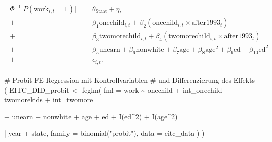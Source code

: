 \documentclass[
  a4paper,
  DIV=11,
  oneside]{scrreprt}
\newenvironment{Shaded}{\begin{snugshade}}{\end{snugshade}}
\newcommand{\AttributeTok}[1]{\textcolor[rgb]{0.40,0.45,0.13}{#1}}
\newcommand{\CommentTok}[1]{\textcolor[rgb]{0.37,0.37,0.37}{#1}}
\newcommand{\DecValTok}[1]{\textcolor[rgb]{0.68,0.00,0.00}{#1}}
\newcommand{\FunctionTok}[1]{\textcolor[rgb]{0.28,0.35,0.67}{#1}}
\newcommand{\NormalTok}[1]{\textcolor[rgb]{0.00,0.23,0.31}{#1}}
\newcommand{\OtherTok}[1]{\textcolor[rgb]{0.00,0.23,0.31}{#1}}
\newcommand{\SpecialCharTok}[1]{\textcolor[rgb]{0.37,0.37,0.37}{#1}}
\newcommand{\StringTok}[1]{\textcolor[rgb]{0.13,0.47,0.30}{#1}}
\begin{document}
\begin{align}
  \begin{split}
    \Phi^{-1}\bigg[P(\text{work}_{i,t} = 1)\bigg] =&\, \theta_\text{Staat} + \eta_t \\
    +&\, \beta_1 \text{onechild}_{i,t} + \beta_2 (\text{onechild}_{i,t} \times \text{after1993}_t) \\
    +&\, \beta_3 \text{twomorechild}_{i,t} + \beta_4 (\text{twomorechild}_{i,t} \times \text{after1993}_t) \\
    +&\, \beta_5 \text{unearn} + \beta_6 \text{nonwhite} + \beta_7 \text{age} + \beta_8 \text{age}^2 + \beta_9 \text{ed} + \beta_{10} \text{ed}^2 \\
    +&\, \epsilon_{i,t}.
  \end{split}
\end{align}

\begin{Shaded}
\begin{Highlighting}[]
\CommentTok{\# Probit{-}FE{-}Regression mit Kontrollvariablen}
\CommentTok{\# und Differenzierung des Effekts}
\NormalTok{(}
\NormalTok{  EITC\_DID\_probit }\OtherTok{\textless{}{-}} \FunctionTok{feglm}\NormalTok{(}
    \AttributeTok{fml =}\NormalTok{ work }\SpecialCharTok{\textasciitilde{}}\NormalTok{ onechild }\SpecialCharTok{+}\NormalTok{ int\_onechild}
    \SpecialCharTok{+}\NormalTok{ twomorekids }\SpecialCharTok{+}\NormalTok{ int\_twomore}
    
    \SpecialCharTok{+}\NormalTok{ unearn }\SpecialCharTok{+}\NormalTok{ nonwhite }\SpecialCharTok{+}\NormalTok{ age }\SpecialCharTok{+}\NormalTok{ ed }
    \SpecialCharTok{+} \FunctionTok{I}\NormalTok{(ed}\SpecialCharTok{\^{}}\DecValTok{2}\NormalTok{) }\SpecialCharTok{+} \FunctionTok{I}\NormalTok{(age}\SpecialCharTok{\^{}}\DecValTok{2}\NormalTok{)}
    
    \SpecialCharTok{|}\NormalTok{ year }\SpecialCharTok{+}\NormalTok{ state, }
    \AttributeTok{family =} \FunctionTok{binomial}\NormalTok{(}\StringTok{"probit"}\NormalTok{),}
    \AttributeTok{data =}\NormalTok{ eitc\_data}
\NormalTok{  )}
\NormalTok{)}
\end{Highlighting}
\end{Shaded}
\end{document}
